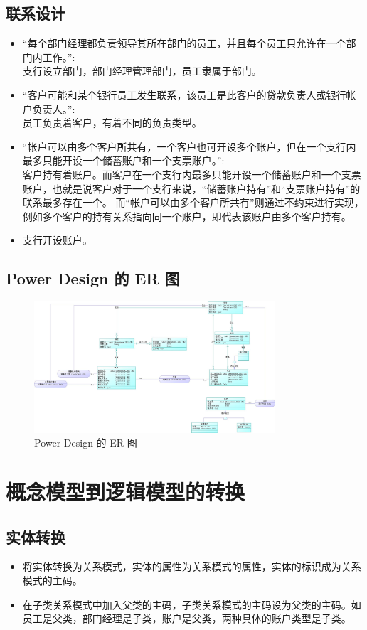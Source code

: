 \documentclass{article}
\begin{document}
    \subsection{联系设计}
    \begin{itemize}

        \item ``每个部门经理都负责领导其所在部门的员工，并且每个员工只允许在一个部门内工作。'': \\
        支行设立部门，部门经理管理部门，员工隶属于部门。
        \item ``客户可能和某个银行员工发生联系，该员工是此客户的贷款负责人或银行帐户负责人。'': \\
        员工负责着客户，有着不同的负责类型。
        \item ``帐户可以由多个客户所共有，一个客户也可开设多个账户，但在一个支行内最多只能开设一个储蓄账户和一个支票账户。'': \\
        客户持有着账户。而客户在一个支行内最多只能开设一个储蓄账户和一个支票账户，也就是说客户对于一个支行来说，``储蓄账户持有''和``支票账户持有''的联系最多存在一个。
        而``帐户可以由多个客户所共有''则通过不约束进行实现，例如多个客户的持有关系指向同一个账户，即代表该账户由多个客户持有。
        \item 支行开设账户。
    \end{itemize}
    \subsection{Power Design 的 ER 图}
    \begin{figure}[H]
        \centering
        \includegraphics[width=0.8\textwidth]{./lab02/cdm.jpg}
        \caption{Power Design 的 ER 图}
    \end{figure}
    \section{概念模型到逻辑模型的转换}
    \subsection{实体转换}
    \begin{itemize}
        \item 将实体转换为关系模式，实体的属性为关系模式的属性，实体的标识成为关系模式的主码。
        \item 在子类关系模式中加入父类的主码，子类关系模式的主码设为父类的主码。如员工是父类，部门经理是子类，账户是父类，两种具体的账户类型是子类。
    \end{itemize}
\end{document}
